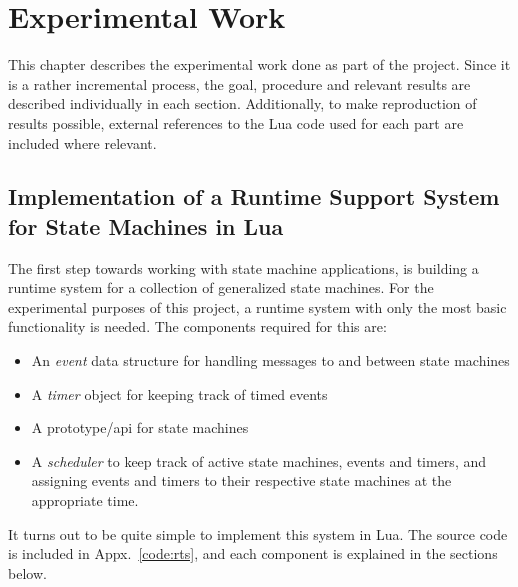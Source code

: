 \chapter{Experimental Work}
\label{ch:experimental_work}
This chapter describes the experimental work done as part of the project. Since it is a rather incremental process, the goal, procedure and relevant results are described individually in each section. Additionally, to make reproduction of results possible, external references to the Lua code used for each part are included where relevant.

\section{Implementation of a Runtime Support System for State Machines in Lua}
\label{sec:impl_runtime_support}
The first step towards working with state machine applications, is building a runtime system for a collection of generalized state machines. For the experimental purposes of this project, a runtime system with only the most basic functionality is needed. The components required for this are:

\begin{itemize}
	\item An \emph{event} data structure for handling messages to and between state machines
	\item A \emph{timer} object for keeping track of timed events
	\item A prototype/\gls{api} for state machines
	\item A \emph{scheduler} to keep track of active state machines, events and timers, and assigning events and timers to their respective state machines at the appropriate time.
\end{itemize}

\noindent
It turns out to be quite simple to implement this system in Lua. The source code is included in Appx.~\ref{code:rts}, and each component is explained in the sections below.

